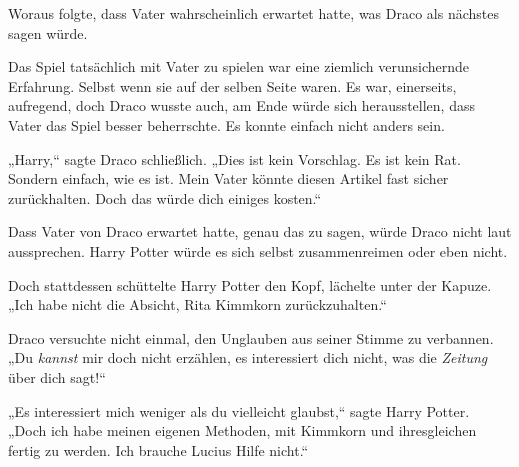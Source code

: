 Woraus folgte, dass Vater wahrscheinlich erwartet hatte, was Draco als nächstes sagen würde.

Das Spiel tatsächlich mit Vater zu spielen war eine ziemlich verunsichernde Erfahrung. Selbst wenn sie auf der selben Seite waren. Es war, einerseits, aufregend, doch Draco wusste auch, am Ende würde sich herausstellen, dass Vater das Spiel besser beherrschte. Es konnte einfach nicht anders sein.

„Harry,“ sagte Draco schließlich. „Dies ist kein Vorschlag. Es ist kein Rat. Sondern einfach, wie es ist. Mein Vater könnte diesen Artikel fast sicher zurückhalten. Doch das würde dich einiges kosten.“

Dass Vater von Draco erwartet hatte, genau das zu sagen, würde Draco nicht laut aussprechen. Harry Potter würde es sich selbst zusammenreimen oder eben nicht.

Doch stattdessen schüttelte Harry Potter den Kopf, lächelte unter der Kapuze. „Ich habe nicht die Absicht, Rita Kimmkorn zurückzuhalten.“

Draco versuchte nicht einmal, den Unglauben aus seiner Stimme zu verbannen. „Du \emph{kannst} mir doch nicht erzählen, es interessiert dich nicht, was die \emph{Zeitung} über dich sagt!“

„Es interessiert mich weniger als du vielleicht glaubst,“ sagte Harry Potter. „Doch ich habe meinen eigenen Methoden, mit Kimmkorn und ihresgleichen fertig zu werden. Ich brauche Lucius Hilfe nicht.“

